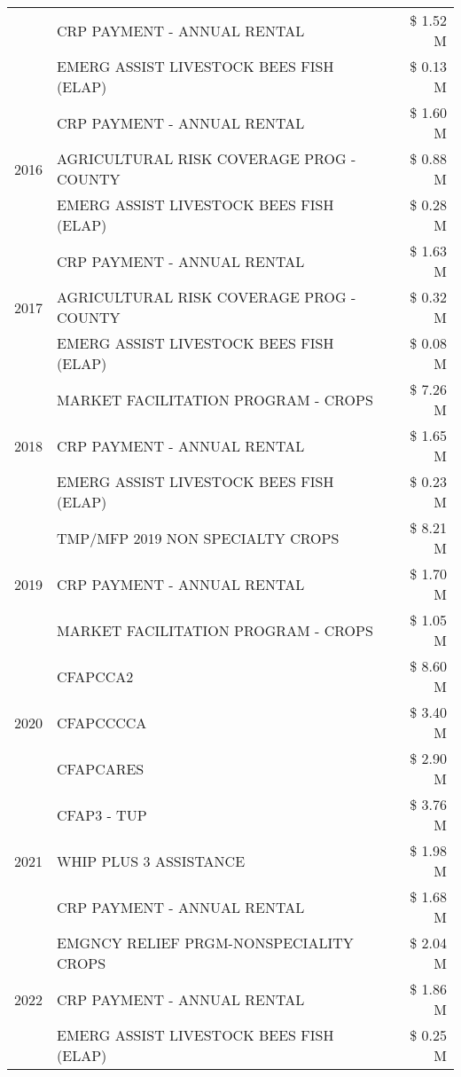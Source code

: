 \begin{tabular}{llr}
 & CRP PAYMENT - ANNUAL RENTAL & \$ 1.52 M \\
 & EMERG ASSIST LIVESTOCK BEES FISH (ELAP) & \$ 0.13 M \\
\cline{1-3}
\multirow[t]{3}{*}{2016} & CRP PAYMENT - ANNUAL RENTAL & \$ 1.60 M \\
 & AGRICULTURAL RISK COVERAGE PROG - COUNTY & \$ 0.88 M \\
 & EMERG ASSIST LIVESTOCK BEES FISH (ELAP) & \$ 0.28 M \\
\cline{1-3}
\multirow[t]{3}{*}{2017} & CRP PAYMENT - ANNUAL RENTAL & \$ 1.63 M \\
 & AGRICULTURAL RISK COVERAGE PROG - COUNTY & \$ 0.32 M \\
 & EMERG ASSIST LIVESTOCK BEES FISH (ELAP) & \$ 0.08 M \\
\cline{1-3}
\multirow[t]{3}{*}{2018} & MARKET FACILITATION PROGRAM - CROPS & \$ 7.26 M \\
 & CRP PAYMENT - ANNUAL RENTAL & \$ 1.65 M \\
 & EMERG ASSIST LIVESTOCK BEES FISH (ELAP) & \$ 0.23 M \\
\cline{1-3}
\multirow[t]{3}{*}{2019} & TMP/MFP 2019 NON SPECIALTY CROPS & \$ 8.21 M \\
 & CRP PAYMENT - ANNUAL RENTAL & \$ 1.70 M \\
 & MARKET FACILITATION PROGRAM - CROPS & \$ 1.05 M \\
\cline{1-3}
\multirow[t]{3}{*}{2020} & CFAPCCA2 & \$ 8.60 M \\
 & CFAPCCCCA & \$ 3.40 M \\
 & CFAPCARES & \$ 2.90 M \\
\cline{1-3}
\multirow[t]{3}{*}{2021} & CFAP3 - TUP & \$ 3.76 M \\
 & WHIP PLUS 3 ASSISTANCE & \$ 1.98 M \\
 & CRP PAYMENT - ANNUAL RENTAL & \$ 1.68 M \\
\cline{1-3}
\multirow[t]{3}{*}{2022} & EMGNCY RELIEF PRGM-NONSPECIALITY CROPS & \$ 2.04 M \\
 & CRP PAYMENT - ANNUAL RENTAL & \$ 1.86 M \\
 & EMERG ASSIST LIVESTOCK BEES FISH (ELAP) & \$ 0.25 M \\
\cline{1-3}
\bottomrule
\end{tabular}
